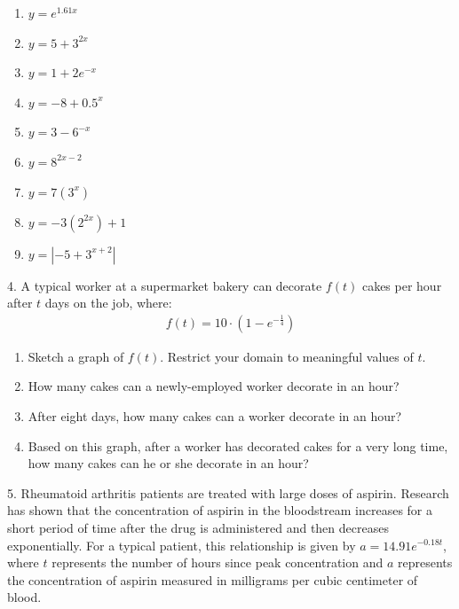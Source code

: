 \documentclass[10pt,]{book}
\theoremstyle{plain}
\theoremstyle{definition}
\theoremstyle{definition}
\theoremstyle{definition}
\numberwithin{equation}{section}
\begin{document}
\begin{exerciselist}
\begin{enumerate}[label=(\alph*)]
\item\hypertarget{li-128}{}\(y=e^{1.61x}\)%
\item\hypertarget{li-129}{}\(y=5+3^{2x}\)%
\item\hypertarget{li-130}{}\(y=1+2e^{-x}\)%
\item\hypertarget{li-131}{}\(y=-8+0.5^x\)%
\item\hypertarget{li-132}{}\(y=3-6^{-x}\)%
\item\hypertarget{li-133}{}\(y=8^{2x-2}\)%
\item\hypertarget{li-134}{}\(y=7(3^x)\)%
\item\hypertarget{li-135}{}\(y=-3(2^{2x})+1\)%
\item\hypertarget{li-136}{}\(y=|-5+3^{x+2}|\)%
\end{enumerate}
\par\smallskip
\item[4.]\hypertarget{exercise-65}{}\hypertarget{p-261}{}%
A typical worker at a supermarket bakery can decorate \(f(t)\) cakes per hour after \(t\) days on the job, where:%
%
\begin{gather*}
f(t)=10 \cdot ( 1-e^{-\frac{1}{4}} )
\end{gather*}
\leavevmode%
\begin{enumerate}[label=(\alph*)]
\item\hypertarget{li-137}{}Sketch a graph of \(f(t)\). Restrict your domain to meaningful values of \(t\).%
\item\hypertarget{li-138}{}How many cakes can a newly-employed worker decorate in an hour?%
\item\hypertarget{li-139}{}After eight days, how many cakes can a worker decorate in an hour?%
\item\hypertarget{li-140}{}Based on this graph, after a worker has decorated cakes for a very long time, how many cakes can he or she decorate in an hour?%
\end{enumerate}
\par\smallskip
\item[5.]\hypertarget{exercise-66}{}\hypertarget{p-262}{}%
Rheumatoid arthritis patients are treated with large doses of aspirin.  Research has shown that the concentration of aspirin in the bloodstream increases for a short period of time after the drug is administered and then decreases exponentially.  For a typical patient, this relationship is given by \(a=14.91e^{-0.18t}\), where \(t\) represents the number of hours since peak concentration and \(a\) represents the concentration of aspirin measured in milligrams per cubic centimeter of blood.%

\end{exerciselist}
\end{document}
